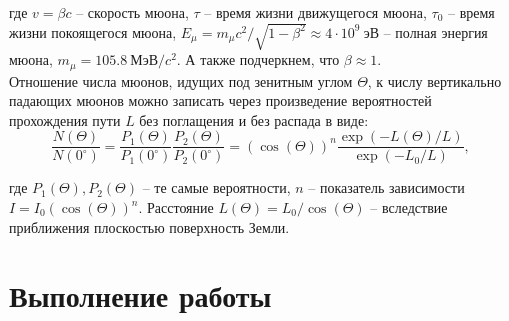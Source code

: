 \documentclass{lab}
\begin{document}
где $ v = \beta c $ -- скорость мюона, $ \tau $ -- время жизни движущегося мюона, $ \tau_0 $ -- время жизни покоящегося мюона, $ E_{\mu} = m_{\mu} c^2 / \sqrt{1 - \beta^2} \approx 4 \cdot 10^9~эВ $ -- полная энергия мюона, $ m_{\mu} = 105.8~МэВ / c^2 $. А также подчеркнем, что $ \beta \approx 1 $.\\

Отношение числа мюонов, идущих под зенитным углом $ \Theta $, к числу вертикально падающих мюонов можно записать через произведение вероятностей прохождения пути $ L $ без поглащения и без распада в виде:
\begin{equation}\label{eq-2}
\dfrac{N(\Theta)}{N(0^{\circ})} = \dfrac{P_1(\Theta)}{P_1(0^{\circ})} \dfrac{P_2(\Theta)}{P_2(0^{\circ})} = (\cos (\Theta))^n \dfrac{\exp(-L(\Theta)/L)}{\exp(-L_0/L)},
\end{equation}

где $ P_1(\Theta), P_2(\Theta) $ -- те самые вероятности, $ n $ -- показатель зависимости $ I = I_0 (\cos (\Theta))^n $. Расстояние $ L(\Theta) = L_0 / \cos (\Theta) $ -- вследствие приближения плоскостью поверхность Земли.

\newpage

\section*{Выполнение работы}
\end{document}
